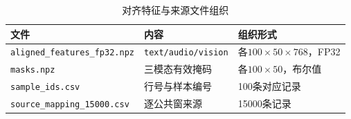 \begin{table}[H]
\centering
\caption{对齐特征与来源文件组织}\label{tab:q1_output_files}
\small
\renewcommand{\arraystretch}{1.15}
\begin{tabularx}{\textwidth}{@{}p{6.0cm}X>{\raggedright\arraybackslash}p{3.8cm}@{}}
\toprule
文件 & 内容 & 组织形式 \\
\midrule
\texttt{aligned\_features\_fp32.npz} & \texttt{text/audio/vision} & 各$100\times50\times768$，FP32 \\
\texttt{masks.npz} & 三模态有效掩码 & 各$100\times50$，布尔值 \\
\texttt{sample\_ids.csv} & 行号与样本编号 & 100条对应记录 \\
\texttt{source\_mapping\_15000.csv} & 逐公共窗来源 & 15000条记录 \\
\bottomrule
\end{tabularx}
\end{table}
